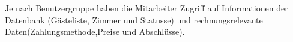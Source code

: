 \documentclass[../../Pflichtenheft.tex]{subfiles}
\begin{document}
    Je nach Benutzergruppe haben die Mitarbeiter Zugriff auf Informationen der Datenbank (Gästeliste, Zimmer und Statusse) und rechnungsrelevante Daten(Zahlungsmethode,Preise und Abschlüsse).
\end{document}

